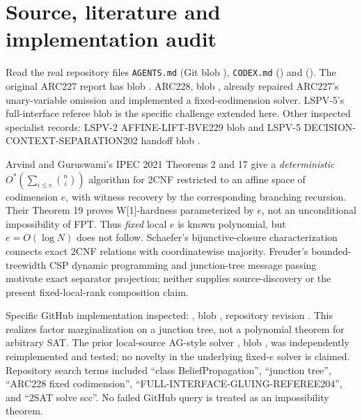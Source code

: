\documentclass[11pt]{article}
\begin{document}
\section{Source, literature and implementation audit}
Read the real repository files \texttt{AGENTS.md} (Git blob \texttt{}), \texttt{CODEX.md} (\texttt{}) and  (\texttt{}).  The original ARC227 report has blob \texttt{}.  ARC228, blob \texttt{}, already repaired ARC227's unary-variable omission and implemented a fixed-codimension solver.  LSPV-5's full-interface referee blob \texttt{} is the specific challenge extended here.  Other inspected specialist records: LSPV-2 AFFINE-LIFT-BVE229 blob \texttt{} and LSPV-5 DECISION-CONTEXT-SEPARATION202 handoff blob \texttt{}.

Arvind and Guruswami's IPEC 2021 Theorems 2 and 17 give a \emph{deterministic} $O^*(\sum_{i\le e}\binom ni)$ algorithm for 2CNF restricted to an affine space of codimension $e$, with witness recovery by the corresponding branching recursion.  Their Theorem 19 proves W[1]-hardness parameterized by $e$, not an unconditional impossibility of FPT.  Thus \emph{fixed} local $e$ is known polynomial, but $e=O(\log N)$ does not follow.  Schaefer's bijunctive-closure characterization connects exact 2CNF relations with coordinatewise majority.  Freuder's bounded-treewidth CSP dynamic programming and junction-tree message passing motivate exact separator projection; neither supplies source-discovery or the present fixed-local-rank composition claim.

Specific GitHub implementation inspected: , blob \texttt{}, repository revision \texttt{}.  This realizes factor marginalization on a junction tree, not a polynomial theorem for arbitrary SAT.  The prior local-source AG-style solver , blob \texttt{}, was independently reimplemented and tested; no novelty in the underlying fixed-$e$ solver is claimed.  Repository search terms included ``class BeliefPropagation'', ``junction tree'', ``ARC228 fixed codimension'', ``FULL-INTERFACE-GLUING-REFEREE204'', and ``2SAT solve scc''.  No failed GitHub query is treated as an impossibility theorem.
\end{document}
